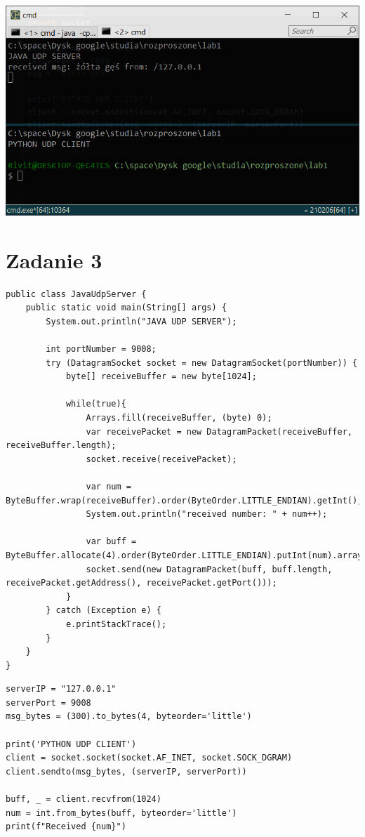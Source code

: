 \documentclass[12pt]{article}
\begin{document}
\begin{center}
\centering
    \includegraphics[scale=0.8]{2.png}
\end{center}

\section{Zadanie 3}

\begin{verbatim}
public class JavaUdpServer {
    public static void main(String[] args) {
        System.out.println("JAVA UDP SERVER");

        int portNumber = 9008;
        try (DatagramSocket socket = new DatagramSocket(portNumber)) {
            byte[] receiveBuffer = new byte[1024];

            while(true){
                Arrays.fill(receiveBuffer, (byte) 0);
                var receivePacket = new DatagramPacket(receiveBuffer, receiveBuffer.length);
                socket.receive(receivePacket);

                var num = ByteBuffer.wrap(receiveBuffer).order(ByteOrder.LITTLE_ENDIAN).getInt();
                System.out.println("received number: " + num++);

                var buff = ByteBuffer.allocate(4).order(ByteOrder.LITTLE_ENDIAN).putInt(num).array();
                socket.send(new DatagramPacket(buff, buff.length, receivePacket.getAddress(), receivePacket.getPort()));
            }
        } catch (Exception e) {
            e.printStackTrace();
        }
    }
}
\end{verbatim}

\newpage
\begin{verbatim}
serverIP = "127.0.0.1"
serverPort = 9008
msg_bytes = (300).to_bytes(4, byteorder='little')

print('PYTHON UDP CLIENT')
client = socket.socket(socket.AF_INET, socket.SOCK_DGRAM)
client.sendto(msg_bytes, (serverIP, serverPort))

buff, _ = client.recvfrom(1024)
num = int.from_bytes(buff, byteorder='little')
print(f"Received {num}")
\end{verbatim}
\end{document}
